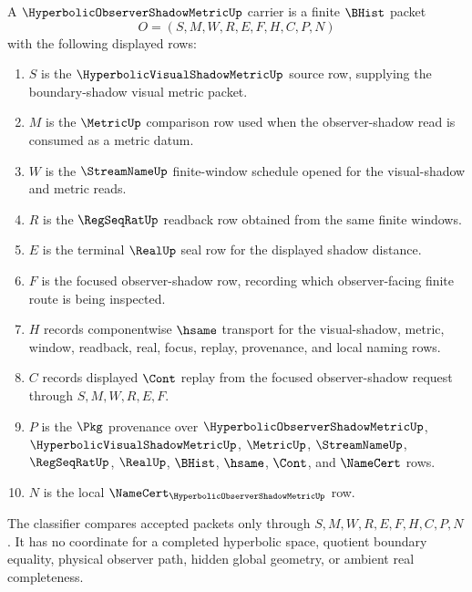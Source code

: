 \begin{definition}
\label{def:hyperbolic-observer-shadow-metric-carrier}
A $\HyperbolicObserverShadowMetricUp$ carrier is a finite $\BHist$ packet
$$
O=(S,M,W,R,E,F,H,C,P,N)
$$
with the following displayed rows:
\begin{enumerate}
\item $S$ is the $\HyperbolicVisualShadowMetricUp$ source row, supplying the boundary-shadow visual metric packet.
\item $M$ is the $\MetricUp$ comparison row used when the observer-shadow read is consumed as a metric datum.
\item $W$ is the $\StreamNameUp$ finite-window schedule opened for the visual-shadow and metric reads.
\item $R$ is the $\RegSeqRatUp$ readback row obtained from the same finite windows.
\item $E$ is the terminal $\RealUp$ seal row for the displayed shadow distance.
\item $F$ is the focused observer-shadow row, recording which observer-facing finite route is being inspected.
\item $H$ records componentwise $\hsame$ transport for the visual-shadow, metric, window, readback, real, focus, replay, provenance, and local naming rows.
\item $C$ records displayed $\Cont$ replay from the focused observer-shadow request through $S,M,W,R,E,F$.
\item $P$ is the $\Pkg$ provenance over $\HyperbolicObserverShadowMetricUp$, $\HyperbolicVisualShadowMetricUp$, $\MetricUp$, $\StreamNameUp$, $\RegSeqRatUp$, $\RealUp$, $\BHist$, $\hsame$, $\Cont$, and $\NameCert$ rows.
\item $N$ is the local $\NameCert_{\HyperbolicObserverShadowMetricUp}$ row.
\end{enumerate}
The classifier compares accepted packets only through $S,M,W,R,E,F,H,C,P,N$. It has no coordinate for a completed hyperbolic space, quotient boundary equality, physical observer path, hidden global geometry, or ambient real completeness.
\end{definition}

